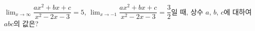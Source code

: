 $\displaystyle\lim_{x\to\infty}\dfrac{ax^2+bx+c}{x^2-2x-3}=5$, $\displaystyle\lim_{x\to-1}\dfrac{ax^2+bx+c}{x^2-2x-3}=\dfrac{3}{2}$일 때, 상수 $a$, $b$, $c$에 대하여 $abc$의 값은?
